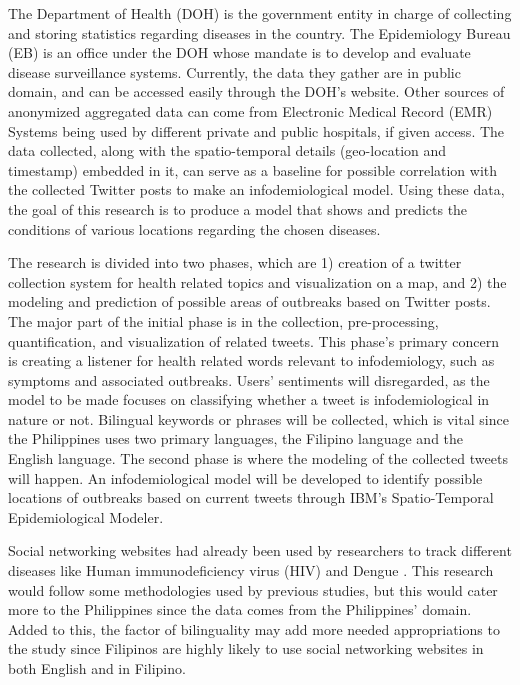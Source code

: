 The Department of Health (DOH) is the government entity in charge of collecting and storing statistics regarding diseases in the country. The Epidemiology Bureau (EB) is an office under the DOH whose mandate is to develop and evaluate disease surveillance systems. Currently, the data they gather are in public domain, and can be accessed easily through the DOH's website. Other sources of anonymized aggregated data can come from Electronic Medical Record (EMR) Systems being used by different private and public hospitals, if given access. The data collected, along with the spatio-temporal details (geo-location and timestamp) embedded in it, can serve as a baseline for possible correlation with the collected Twitter posts to make an infodemiological model. Using these data, the goal of this research is to produce a model that shows and predicts the conditions of various locations regarding the chosen diseases.



The research is divided into two phases, which are 1) creation of a twitter collection system for health related topics and visualization on a map, and 2) the modeling and prediction of possible areas of outbreaks based on Twitter posts. The major part of the initial phase is in the collection, pre-processing, quantification, and visualization of related tweets. This phase's primary concern is creating a listener for health related words relevant to infodemiology, such as symptoms and associated outbreaks. Users' sentiments will  disregarded, as the model to be made focuses on classifying whether a tweet is infodemiological in nature or not. Bilingual keywords or phrases will be collected, which is vital since the Philippines uses two primary languages, the Filipino language and the English language. The second phase is where the modeling of the collected tweets will happen. An infodemiological model will be developed to identify possible locations of outbreaks based on current tweets through IBM's Spatio-Temporal Epidemiological Modeler.

Social networking websites had already been used by researchers to track different diseases like Human immunodeficiency virus (HIV) and Dengue \cite{Young:2014aa, gomide2011dengue}. This research would follow some methodologies used by previous studies, but this would cater more to the Philippines since the data comes from the Philippines' domain. Added to this, the factor of bilinguality may add more needed appropriations to the study since Filipinos are highly likely to use social networking websites in both English and in Filipino.


